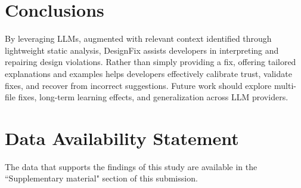 \documentclass[conference]{IEEEtran}
\begin{document}
\section{Conclusions}
By leveraging LLMs, augmented with relevant context identified through lightweight static analysis, DesignFix assists developers in interpreting and repairing design violations. Rather than simply providing a fix, offering tailored explanations and examples helps developers effectively calibrate trust, validate fixes, and recover from incorrect suggestions.  
Future work should explore multi-file fixes, long-term learning effects, and generalization across LLM providers.

\section{Data Availability Statement}
The data that supports the findings of this study are available in the ``Supplementary material" section of this submission. 
\end{document}

